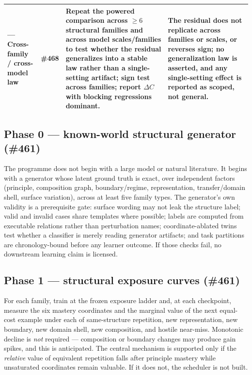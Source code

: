 \documentclass[11pt]{article}
\begin{document}
\begin{table}[t]
\begin{tabularx}{\textwidth}{@{}p{2.05cm}p{1.55cm}YY@{}}
 --- Cross-family / cross-model law & \#468 & Repeat the powered comparison across $\geq 6$ structural families and across model scales/families to test whether the residual generalizes into a stable law rather than a single-setting artifact; sign test across families; report $\Delta C$ with blocking regressions dominant. & The residual does not replicate across families or scales, or reverses sign; no generalization law is asserted, and any single-setting effect is reported as scoped, not general. \\
\bottomrule
\end{tabularx}
\end{table}

\subsection{Phase 0 --- known-world structural generator (\#461)}
The programme does not begin with a large model or natural literature. It begins with a generator whose latent ground truth is exact, over independent factors (principle, composition graph, boundary/regime, representation, transfer/domain shell, surface variation), across at least five family types. The generator's own validity is a prerequisite gate: surface wording may not leak the structure label; valid and invalid cases share templates where possible; labels are computed from executable relations rather than perturbation names; coordinate-ablated twins test whether a classifier is merely reading generator artifacts; and task partitions are chronology-bound before any learner outcome. If those checks fail, no downstream learning claim is licensed.

\subsection{Phase 1 --- structural exposure curves (\#461)}
For each family, train at the frozen exposure ladder and, at each checkpoint, measure the six mastery coordinates and the marginal value of the next equal-cost example under each of same-structure repetition, new representation, new boundary, new domain shell, new composition, and hostile near-miss. Monotonic decline is \emph{not} required --- composition or boundary changes may produce gain spikes, and this is anticipated. The central mechanism is supported only if the \emph{relative} value of equivalent repetition falls after principle mastery while unsaturated coordinates remain valuable. If it does not, the scheduler is not built.
\end{document}
